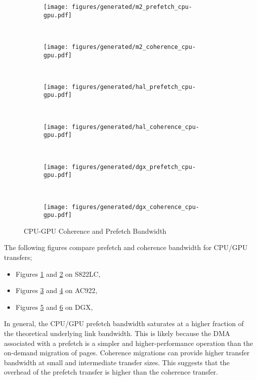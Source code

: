 \begin{figure}[ht]
	\centering
	\begin{subfigure}[b]{0.45\textwidth}
		\texttt{[image: figures/generated/m2\_prefetch\_cpu-gpu.pdf]}
		\caption{}
		\label{fig:um-prefetch-s822lc-cpu-gpu}
	\end{subfigure}
	~
	\begin{subfigure}[b]{0.45\textwidth}
		\texttt{[image: figures/generated/m2\_coherence\_cpu-gpu.pdf]}
		\caption{}
		\label{fig:um-coherence-s822lc-cpu-gpu}
	\end{subfigure}
	\\
	\begin{subfigure}[b]{0.45\textwidth}
		\texttt{[image: figures/generated/hal\_prefetch\_cpu-gpu.pdf]}
		\caption{}
		\label{fig:um-prefetch-ac922-cpu-gpu}
	\end{subfigure}
	~
	\begin{subfigure}[b]{0.45\textwidth}
		\texttt{[image: figures/generated/hal\_coherence\_cpu-gpu.pdf]}
		\caption{}
		\label{fig:um-coherence-ac922-cpu-gpu}
	\end{subfigure}
	\\
	\begin{subfigure}[b]{0.45\textwidth}
		\texttt{[image: figures/generated/dgx\_prefetch\_cpu-gpu.pdf]}
		\caption{}
		\label{fig:um-prefetch-dgx-cpu-gpu}
	\end{subfigure}
	~
	\begin{subfigure}[b]{0.45\textwidth}
		\texttt{[image: figures/generated/dgx\_coherence\_cpu-gpu.pdf]}
		\caption{}
		\label{fig:um-coherence-dgx-cpu-gpu}
	\end{subfigure}
	\caption[]{
		CPU-GPU Coherence and Prefetch Bandwidth
	}
	\label{fig:um-cpu-gpu}
\end{figure}

The following figures compare prefetch and coherence bandwidth for CPU/GPU transfers;
\begin{itemize}
	\item Figures \ref{fig:um-prefetch-s822lc-cpu-gpu} and \ref{fig:um-coherence-s822lc-cpu-gpu} on S822LC,
	\item Figures \ref{fig:um-prefetch-ac922-cpu-gpu} and \ref{fig:um-coherence-ac922-cpu-gpu}   on AC922,
	\item Figures \ref{fig:um-prefetch-dgx-cpu-gpu} and \ref{fig:um-coherence-dgx-cpu-gpu}       on DGX,
\end{itemize}
In general, the CPU/GPU prefetch bandwidth saturates at a higher fraction of the theoretical underlying link bandwidth.
This is likely because the DMA associated with a prefetch is a simpler and higher-performance operation than the on-demand migration of pages.
Coherence migrations can provide higher transfer bandwidth at small and intermediate transfer sizes.
This suggests that the overhead of the prefetch transfer is higher than the coherence transfer.




